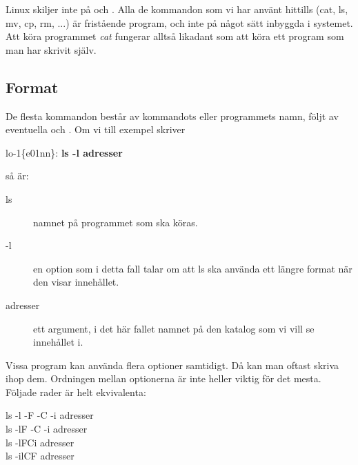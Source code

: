 \documentclass[a4paper,twocolumn]{book}
\begin{document}
Linux skiljer inte på  och
. Alla de kommandon som vi har
använt hittills (cat, ls, mv, cp, rm, ...) är fristående program, och
inte på något sätt inbyggda i systemet. Att köra programmet \emph{cat}
fungerar alltså likadant som att köra ett program som man har skrivit
själv. 

\subsection{Format}

De flesta kommandon består av kommandots eller programmets namn, följt
av eventuella  och . Om vi till
exempel skriver
\begin{example}
lo-1\{e01nn\}: \textbf{ls -l adresser}
\end{example}
så är:
\begin{description}
\item[ls] namnet på programmet som ska köras.
\item[-l] en option som i detta fall talar om att ls ska använda ett
  längre format när den visar innehållet.
\item[adresser] ett argument, i det här fallet namnet på den katalog
  som vi vill se innehållet i.
\end{description}

Vissa program kan använda flera optioner samtidigt. Då kan man oftast
skriva ihop dem. Ordningen mellan optionerna är inte heller viktig för
det mesta. Följade rader är helt ekvivalenta:
\begin{ttquote}
  ls -l -F -C -i adresser \\
  ls -lF -C -i adresser \\
  ls -lFCi adresser \\
  ls -ilCF adresser 
\end{ttquote}
\end{document}
